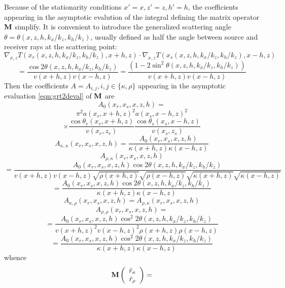 Because of the stationarity conditions $x'=x, z'=z, h'=h$, the
coefficients appearing in the asymptotic evalution of the integral
defining the matrix operator $\bf M$ simplify. It is convenient to
introduce the generalized scattering angle $\theta =
\theta(x,z,h,k_x/k_z,k_h/k_z)$, usually defined as half the angle
between source and receiver rays at the scattering point:
\[
\nabla_{x,z}T(x_r(x,z,h,k_x/k_z,k_h/k_z),x+h,z)\cdot 
\nabla_{x,z}T(x_s(x,z,h,k_x/k_z,k_h/k_z),x-h,z) 
\]
\begin{equation}
\label{eqn:thetadef}
= \frac{\cos 2\theta(x,z,h,k_x/k_z,k_h/k_z)}{v(x+h,z) v(x-h,z)} =
\frac{(1-2\sin^2\theta(x,z,h,k_x/k_z,k_h/k_z))}{v(x+h,z) v(x-h,z)}
\end{equation}
Then the 
coefficients $A = A_{i,j}, i,j \in \{\kappa, \rho\}$ appearing in the
asymptotic evaluation \ref{eqn:grt2deval} of $\bf M$ are 
\[
A_0(x_r,x_s,x,z,h)=
\]
\[
\pi^2 a(x_r,x+h,z)^2  
a(x_s,x-h,z)^2 
\]
\begin{equation}
\label{eqn:grt2dcoeff1red}
\times \frac{\cos \theta_r(x_r,x+h,z)}{v(x_r,z_r)} \frac{\cos\theta_s(x_s,x-h,z)}{v(x_s,z_s)} 
\end{equation}
\begin{equation}
\label{eqn:grt2dcoeff2red}
A_{\kappa,\kappa}(x_r,x_s,x,z,h) = 
\frac{A_0(x_r,x_s,x,z,h)}{\kappa(x+h,z)\kappa(x-h,z)}
\end{equation}
\[
A_{\rho,\kappa}(x_r,x_s,x,z,h) 
\]
\[
=\frac{A_0(x_r,x_s,x,z,h) \cos 2 \theta(x,z,h,k_x/k_z,k_h/k_z)}
{v(x+h,z)
  v(x-h,z)\sqrt{\rho(x+h,z)}\sqrt{\rho(x-h,z)}\sqrt{\kappa(x+h,z)}\sqrt{\kappa(x-h,z)}}
\]
\begin{equation}
\label{eqn:grt2dcoeff3red}
=\frac{A_0(x_r,x_s,x,z,h) \cos 2 \theta(x,z,h,k_x/k_z,k_h/k_z)}
{\kappa(x+h,z)\kappa(x-h,z)}
\end{equation}
\begin{equation}
\label{eqn:grt2dcoeff4red}
A_{\kappa,\rho}(x_r,x_s,x,z,h) =
A_{\rho,\kappa}(x_r,x_s,x,z,h)
\end{equation}
\[
A_{\rho,\rho}(x_r,x_s,x,z,h) =
\]
\[
=\frac{A_0(x_r,x_s,x,z,h) \cos^2 2 \theta(x,z,h,k_x/k_z,k_h/k_z)}
{v(x+h,z)^2v(x-h,z)^2\rho(x+h,z)\rho(x-h,z)}
\]
\begin{equation}
\label{eqn:grt2dcoeff5red}
=\frac{A_0(x_r,x_s,x,z,h) \cos^2 2 \theta(x,z,h,k_x/k_z,k_h/k_z)}
{\kappa(x+h,z)\kappa(x-h,z)}
\end{equation}
whence
\[
{\bf M} 
\left(\begin{array}{c}
\bar{r}_{\kappa} \\
\bar{r}_{\rho}
\end{array}
\right) = 
\]
